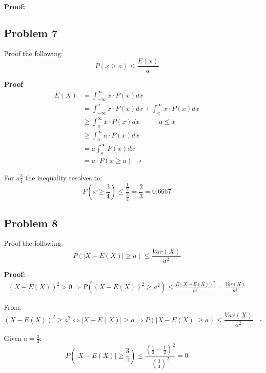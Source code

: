 \textbf{Proof:}

\subsection*{Problem 7}
Proof the following:
\begin{equation*}
P(x\geq a)\leq \frac{E(x)}{a}
\end{equation*}

\textbf{Proof}
\begin{align*}
E(X)	&=\int_{-\infty}^{\infty}x\cdot P(x)dx	\\
		&=\int_{-\infty}^{a}x\cdot P(x)dx+\int_{a}^{\infty}x\cdot P(x)dx	\\
		&\geq\int_{a}^{\infty}x\cdot P(x)dx	\qquad\mid a\leq x\\
		&\geq\int_{a}^{\infty}a\cdot P(x)dx	\\
		&=a\int_{a}^{\infty}P(x)dx	\\
		&=a\cdot P(x\geq a)\quad\square
\end{align*}

For $a\frac{3}{4}$ the inequality resolves to:
\begin{equation*}
P(x\geq \frac{3}{4})\leq \dfrac{\frac{1}{2}}{\frac{3}{4}}=\frac{2}{3}=0.6667
\end{equation*}

\subsection*{Problem 8}
Proof the following:
\begin{equation*}
P(\mid X-E(X)\mid\geq a)\leq\frac{Var(X)}{a^{2}}
\end{equation*}

\textbf{Proof:}
\begin{align*}
(X-E(X))^{2}> 0\Rightarrow P((X-E(X))^{2}\geq a^{2}) \leq \frac{E(X-E(X))^{2}}{a^{2}}=\frac{Var(X)}{a^{2}}
\end{align*}

From:
\begin{equation*}
(X-E(X))^{2}\geq a^{2}\Longleftrightarrow \mid X-E(X)\mid\geq a\Rightarrow P(\mid X-E(X)\mid\geq a)\leq\frac{Var(X)}{a^{2}}\quad\square
\end{equation*}

Given $a=\frac{3}{4}$:
\begin{equation*}
P(\mid X-E(X)\mid\geq \frac{3}{4})\leq\dfrac{(\frac{1}{2}-\frac{1}{2})^{2}}{\left(\frac{3}{4}\right)^{2}} =0
\end{equation*}

